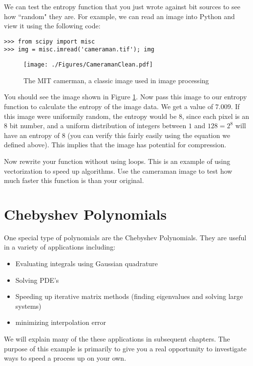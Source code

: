 We can test the entropy function that you just wrote against bit sources to see how ``random" they are. For example, we can read an image into Python and view it using the following code:
\begin{lstlisting}[style=python]
>>> from scipy import misc
>>> img = misc.imread('cameraman.tif'); img
\end{lstlisting}

\begin{figure}[h!]
\begin{center}
\texttt{[image: ./Figures/CameramanClean.pdf]}
\end{center}
\caption{The MIT camerman, a classic image used in image processing}
\label{fig:cameramanclean}
\end{figure}
You should see the image shown in Figure \ref{fig:cameramanclean}. Now pass this image to our entropy function to calculate the entropy of the image data. We get a value of $7.009$. If this image were uniformily random, the entropy would be $8$, since each pixel is an $8$ bit number, and a uniform distribution of integers between $1$ and $128 = 2^8$ will have an entropy of $8$ (you can verify this fairly easily using the equation we defined above). This implies that the image has potential for compression.

\begin{problem}
Now rewrite your function without using loops. This is an example of using vectorization to speed up algorithms. Use the cameraman image to test how much faster this function is than your original.
\end{problem}

\section*{Chebyshev Polynomials}

One special type of polynomials are the Chebyshev Polynomials. They are useful in a variety of applications including:
\begin{itemize}
\item Evaluating integrals using Gaussian quadrature
\item Solving PDE's
\item Speeding up iterative matrix methods (finding eigenvalues and solving large systems)
\item minimizing interpolation error
\end{itemize}

We will explain many of the these applications in subsequent chapters. The purpose of this example is primarily to give you a real opportunity to investigate ways to speed a process up on your own.

